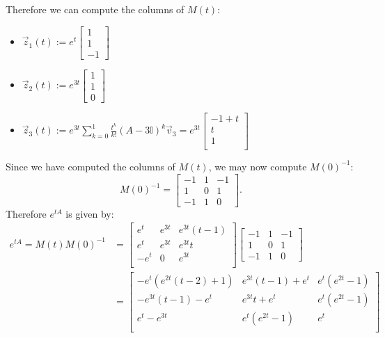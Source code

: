\documentclass[12pt, letterpaper]{article}
\begin{document}
\begin{enumerate}
	Therefore we can compute the columns of $M(t)$:
	\begin{itemize}
		\item $\Vec{z}_1(t) := e^t \begin{bmatrix}
		1 \\ 1 \\ -1
\end{bmatrix}		 $
		\item $\Vec{z}_2(t) := e^{3t} \begin{bmatrix}
		1 \\ 1 \\ 0
\end{bmatrix}		 $
		\item $\displaystyle \Vec{z}_3(t) := e^{3t}\sum_{k=0}^1 \frac{t^k}{k!} (A-3 \mathbb{I})^k \Vec{v}_3 = e^{3t}\begin{bmatrix}
		-1 +t\\ t\\1 \\ 
\end{bmatrix}		 $
	\end{itemize}
		Since we have computed the columns of $M(t)$, we may now compute $M(0)^{-1}$:
		$$
		M(0)^{-1} = \begin{bmatrix}
		
 -1 & 1 & -1 \\
 1 & 0 & 1 \\
 -1 & 1 & 0 
\end{bmatrix}.				
		$$
		Therefore $e^{tA}$ is given by:
		\begin{align*}		
		e^{tA} = M(t)M(0)^{-1} &= \begin{bmatrix}
		e^t & e^{3 t} & e^{3 t} (t-1) \\
 e^t & e^{3 t} & e^{3 t} t \\
 -e^t & 0 & e^{3 t} \\
\end{bmatrix}		\begin{bmatrix}	
 -1 & 1 & -1 \\
 1 & 0 & 1 \\
 -1 & 1 & 0 
\end{bmatrix}\\
 &= \begin{bmatrix}
 -e^t \left(e^{2 t} (t-2)+1\right) & e^{3 t} (t-1)+e^t & e^t
   \left(e^{2 t}-1\right) \\
 -e^{3 t} (t-1)-e^t & e^{3 t} t+e^t & e^t \left(e^{2 t}-1\right)
   \\
 e^t-e^{3 t} & e^t \left(e^{2 t}-1\right) & e^t \\
\end{bmatrix}  
		\end{align*}
\end{enumerate}
\end{document}
